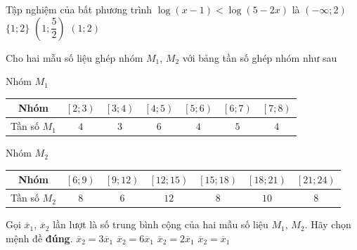\begin{ex}%
	Tập nghiệm của bất phương trình $\log(x-1)<\log(5-2x)$ là
	\choice
	{$(-\infty;2)$}
	{$\{1;2\}$}
	{$\left(1;\dfrac{5}{2}\right)$}
	{\True $(1;2)$}
\end{ex}

\begin{ex}%
	Cho hai mẫu số liệu ghép nhóm $M_1$, $M_2$ với bảng tần số ghép nhóm như sau
	\begin{center}
		Nhóm $M_1$
		\begin{tabular}{|c|c|c|c|c|c|c|}
			\hline
			Nhóm & $\left[2;3\right)$ &$\left[3;4\right)$ &$\left[4;5\right)$ &$\left[5;6\right)$ &$\left[6;7\right)$ &$\left[7;8\right)$ \\
			\hline
			Tần số $M_1$ & $4$ & $3$ & $6$ & $4$ & $5$ & $4$ \\
			\hline
		\end{tabular}
	\end{center}
	
	\begin{center}
		Nhóm $M_2$
		\begin{tabular}{|c|c|c|c|c|c|c|}
			\hline
			Nhóm &$\left[6;9\right)$ &$\left[9;12\right)$ &$\left[12;15\right)$ &$\left[15;18\right)$ &$\left[18;21\right)$ &$\left[21;24\right)$ \\
			\hline
			Tần số $M_2$ & $8$ & $6$ & $12$ & $8$ & $10$ & $8$ \\
			\hline
		\end{tabular}
	\end{center}
	Gọi $\overline{x}_1$, $\overline{x}_2$ lần lượt là số trung bình cộng của hai mẫu số liệu $M_1$, $M_2$. Hãy chọn mệnh đề \textbf{đúng}.
	\choice
	{\True $\overline{x}_2=3\overline{x}_1$}
	{$\overline{x}_2=6\overline{x}_1$}
	{$\overline{x}_2=2\overline{x}_1$}
	{$\overline{x}_2=\overline{x}_1$}
\end{ex}

